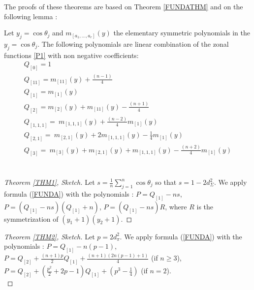 \documentclass[10pt]{article}
\begin{document}
 The proofs of these theorems are based on Theorem \ref{FUNDATHM} and
 on  the following lemma : 

 \begin{lemma} Let $y_j=\cos \theta_j$ and 
  $m_{[a_1,...,a_r]}(y)$ the elementary symmetric
  polynomials in  the $y_j=\cos \theta_j$.
  The following polynomials  are linear combination of the zonal
  functions \eqref{P1} with non negative coefficients:
  $$\begin{array}{l}  Q_{[0]}=1 \\
 Q_{[11]}=m_{[11]}(y)+\frac{(n-1)}{4}\\
 Q_{[1]}=m_{[1]}(y) \\
 Q_{[2]}=m_{[2]}(y)+m_{[11]}(y)-\frac{(n+1)}{4}\\
  Q_{[1,1,1]} =\ m_{[1,1,1]}(y) + \frac{(n-2)}{4}m_{[1]}(y)\\
 Q_{[2,1]} =\  m_{[2,1]}(y) +2 m_{[1,1,1]}(y) -\frac{1}{4} m_{[1]}(y) \\
 Q_{[3]} = \  m_{[3]}(y)+m_{[2,1]}(y)+m_{[1,1,1]}(y) -\frac{(n+2)}{4} m_{[1]}(y)\\
  \end{array}$$\\
  \end{lemma}

 \begin{proof}[Theorem \ref{THM1}, Sketch] 
    Let $s=\frac 1 n \sum_{j=1}^n \cos \theta_j$ so that  $s=1-2d_\Sigma^2$.
   We apply formula (\ref{FUNDA}) with the polynomials :
   $P=Q_{[1]}-ns$, 
   $P=(Q_{[1]}-ns)(Q_{[1]}+n)$, $P=(Q_{[1]}-ns)R$, where $R$ is the symmetrization of
   $(y_1+1)(y_2+1)$.

 \end{proof}

 
 \begin{proof}[Theorem \ref{THM2}, Sketch] 
Let $p=2d_\pi^2$. We apply formula (\ref{FUNDA}) with the polynomials : 
 $P=Q_{[1]}-n(p-1)$, $P=Q_{[2]}+\frac{(n+1)p}{2}Q_{[1]}+\frac{(n+1)(2n(p-1)+1)}{4}$ \quad (if $n\ge 3$),\\  
 $P=Q_{[2]}+(\frac{p^2}{2}+2p-1)Q_{[1]}+(p^3-\frac{1}{4})$ \quad (if $n=2$).\\
 \end{proof}

 
\end{document}
